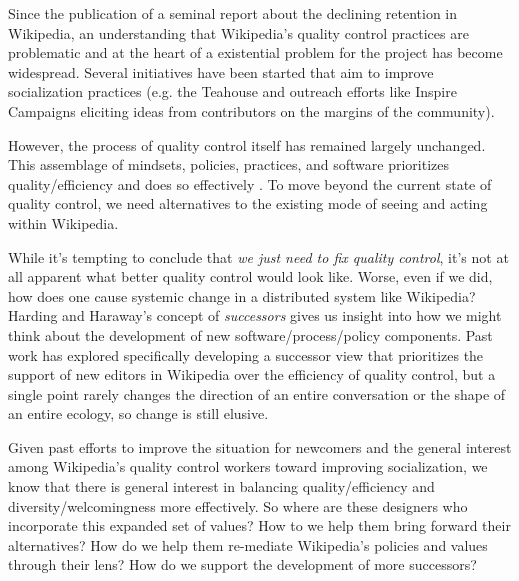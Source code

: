 Since the publication of a seminal report about the declining retention in Wikipedia, an understanding that Wikipedia's quality control practices are problematic and at the heart of a existential problem for the project has become widespread.  Several initiatives have been started that aim to improve socialization practices (e.g. the Teahouse and outreach efforts like Inspire Campaigns\cite{morgan2015what} eliciting ideas from contributors on the margins of the community).

However, the process of quality control itself has remained largely unchanged.  This assemblage of mindsets, policies, practices, and software prioritizes quality/efficiency and does so effectively \cite{geiger2013levee}\cite{halfaker2014snuggle}.  To move beyond the current state of quality control, we need alternatives to the existing mode of seeing and acting within Wikipedia.

While it's tempting to conclude that \emph{we just need to fix quality control}, it's not at all apparent what better quality control would look like.  Worse, even if we did, how does one cause systemic change in a distributed system like Wikipedia?  Harding and Haraway's concept of \emph{successors}\cite{haraway1988situated}\cite{harding1987feminism} gives us insight into how we might think about the development of new software/process/policy components.  Past work has explored specifically developing a successor view that prioritizes the support of new editors in Wikipedia over the efficiency of quality control\cite{halfaker2014snuggle}\cite{geiger2014successor}, but a single point rarely changes the direction of an entire conversation or the shape of an entire ecology, so change is still elusive.

Given past efforts to improve the situation for newcomers\cite{morgan2013tea} and the general interest among Wikipedia's quality control workers toward improving socialization\cite{halfaker2014snuggle}, we know that there is general interest in balancing quality/efficiency and diversity/welcomingness more effectively.  So where are these designers who incorporate this expanded set of values?  How to we help them bring forward their alternatives?  How do we help them re-mediate Wikipedia's policies and values through their lens?  How do we support the development of more successors?

